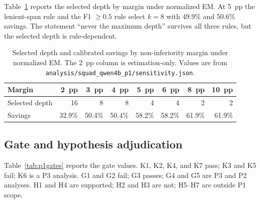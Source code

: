 \documentclass[a4paper,fleqn]{cas-sc}
\begin{document}
Table~\ref{tab:p1margin} reports the selected depth by margin under normalized EM. At 5~pp the
lenient-span rule and the F1 $\ge0.5$ rule select $k=8$ with 49.9\% and 50.6\% savings. The
statement ``never the maximum depth'' survives all three rules, but the selected depth is
rule-dependent.

\begin{table}[pos=htbp]
  \centering
  \caption{Selected depth and calibrated savings by non-inferiority margin under normalized EM.
  The 2~pp column is estimation-only. Values are from
  \texttt{analysis/squad\_qwen4b\_p1/sensitivity.json}.}
  \label{tab:p1margin}
  \small
  \setlength{\tabcolsep}{5pt}
  \begin{tabular}{lrrrrrrr}
    \toprule
    \textbf{Margin} & \textbf{2~pp} & \textbf{3~pp} & \textbf{4~pp} & \textbf{5~pp} & \textbf{6~pp} & \textbf{8~pp} & \textbf{10~pp} \\
    \midrule
    Selected depth & 16 & 8 & 8 & 4 & 4 & 2 & 2 \\
    Savings & 32.9\% & 50.4\% & 50.4\% & 58.2\% & 58.2\% & 61.9\% & 61.9\% \\
    \bottomrule
  \end{tabular}
\end{table}

\subsection{Gate and hypothesis adjudication}

Table~\ref{tab:p1gates} reports the gate values. K1, K2, K4, and K7 pass; K3 and K5 fail; K6 is
a P3 analysis. G1 and G2 fail; G3 passes; G4 and G5 are P3 and P2 analyses. H1 and H4 are
supported; H2 and H3 are not; H5--H7 are outside P1 scope.
\end{document}

